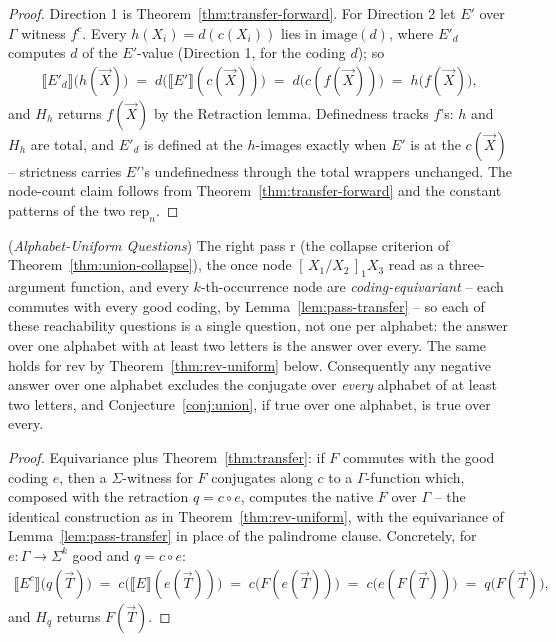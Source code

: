 \documentclass[runningheads,envcountsect]{llncs}
\begin{document}
\begin{proof}
    Direction 1 is Theorem~\ref{thm:transfer-forward}. For Direction 2 let $E'$ over $\Gamma$ witness $f^c$. Every $h(X_i) = d(c(X_i))$ lies in $\mathrm{image}(d)$, where $E'_d$ computes $d$ of the $E'$-value (Direction 1, for the coding $d$); so
    \begin{align*}
        \llbracket E'_d \rrbracket\big(h(\vec X)\big)
        \;=\; d\big(\llbracket E' \rrbracket(c(\vec X))\big)
        \;=\; d\big(c(f(\vec X))\big) \;=\; h\big(f(\vec X)\big),
    \end{align*}
    and $H_h$ returns $f(\vec X)$ by the Retraction lemma. Definedness tracks $f$'s: $h$ and $H_h$ are total, and $E'_d$ is defined at the $h$-images exactly when $E'$ is at the $c(\vec X)$ -- strictness carries $E'$'s undefinedness through the total wrappers unchanged. The node-count claim follows from Theorem~\ref{thm:transfer-forward} and the constant patterns of the two $\mathrm{rep}_n$.
\end{proof}

\begin{corollary}
    (\emph{Alphabet-Uniform Questions})
    \label{cor:uniform}
    The right pass $\mathrm{r}$ (the collapse criterion of Theorem~\ref{thm:union-collapse}), the once node $[\,X_1/X_2\,]_1 X_3$ read as a three-argument function, and every $k$-th-occurrence node are \emph{coding-equivariant} -- each commutes with every good coding, by Lemma~\ref{lem:pass-transfer} -- so each of these reachability questions is a single question, not one per alphabet: the answer over one alphabet with at least two letters is the answer over every. The same holds for $\mathrm{rev}$ by Theorem~\ref{thm:rev-uniform} below. Consequently any negative answer over one alphabet excludes the conjugate over \emph{every} alphabet of at least two letters, and Conjecture~\ref{conj:union}, if true over one alphabet, is true over every.
\end{corollary}

\begin{proof}
    Equivariance plus Theorem~\ref{thm:transfer}: if $F$ commutes with the good coding $e$, then a $\Sigma$-witness for $F$ conjugates along $c$ to a $\Gamma$-function which, composed with the retraction $q = c \circ e$, computes the native $F$ over $\Gamma$ -- the identical construction as in Theorem~\ref{thm:rev-uniform}, with the equivariance of Lemma~\ref{lem:pass-transfer} in place of the palindrome clause. Concretely, for $e : \Gamma \rightarrow \Sigma^k$ good and $q = c \circ e$:
    \begin{align*}
        \llbracket E^c \rrbracket\big(q(\vec T)\big) \;=\; c\big(\llbracket E \rrbracket(e(\vec T))\big) \;=\; c\big(F(e(\vec T))\big) \;=\; c\big(e(F(\vec T))\big) \;=\; q\big(F(\vec T)\big),
    \end{align*}
    and $H_q$ returns $F(\vec T)$.
\end{proof}
\end{document}
